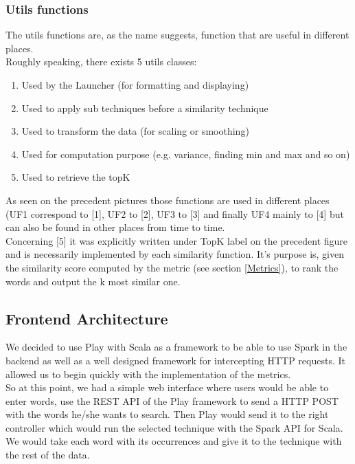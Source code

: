 \documentclass{article}
\begin{document}
\subsubsection{Utils functions}
The utils functions are, as the name suggests, function that are useful in different places.\\

Roughly speaking, there exists 5 utils classes:


\begin{enumerate}
\item Used by the Launcher (for formatting and displaying)
\item Used to apply sub techniques before a similarity technique
\item Used to transform the data (for scaling or smoothing)
\item Used for computation purpose (e.g. variance, finding min and max and so on)
\item Used to retrieve the topK
\end{enumerate}


As seen on the precedent pictures those functions are used in different places (UF1 correspond to [1], UF2 to [2], UF3 to [3] and finally UF4 mainly to [4] but can also be found in other places from time to time.\\

Concerning  [5] it was explicitly written under TopK label on the precedent figure and is necessarily implemented by each similarity function. It’s purpose is, given the similarity score computed by the metric (see section \ref{Metrics}), to rank the words and output the k most similar one.




\subsection{Frontend Architecture}

We decided to use Play with Scala as a framework to be able to use Spark in the backend as well as a well designed framework for intercepting HTTP requests.
It allowed us to begin quickly with the implementation of the metrics. \\

So at this point, we had a simple web interface where users would be able to enter words, use the REST API of the Play framework to send a HTTP POST with the words he/she wants to search.
Then Play would send it to the right controller which would run the selected technique with the Spark API for Scala. We would take each word with its occurrences and give it to the technique with the rest of the data. \\
\end{document}
